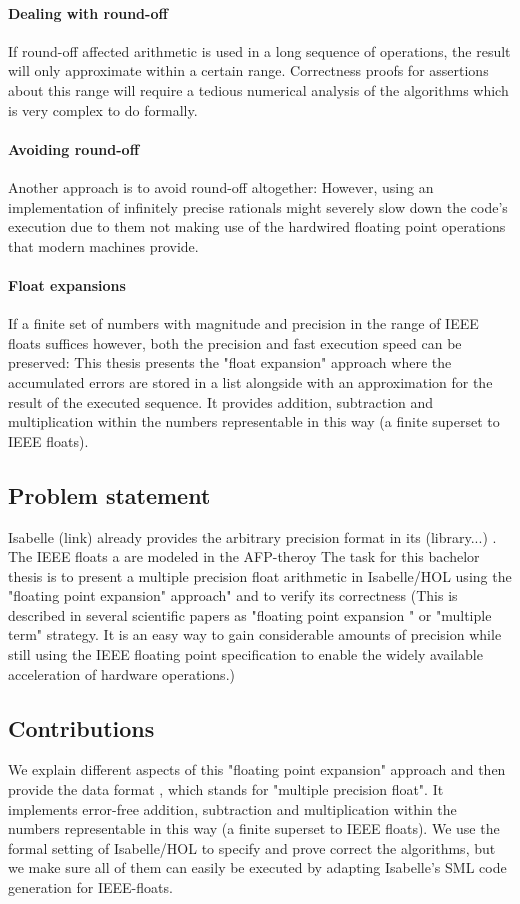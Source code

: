 \documentclass[11pt,a4paper]{article}
\begin{document}
\paragraph{Dealing with round-off}
If round-off affected arithmetic is used in a long sequence of operations, the result will only approximate within a certain range. Correctness proofs for assertions about this range will require a tedious numerical analysis of the algorithms which is very complex to do formally.

\paragraph{Avoiding round-off}
Another approach is to avoid round-off altogether: However, using an implementation of infinitely precise rationals might severely slow down the code's execution due to them not making use of the hardwired floating point operations that modern machines provide.

\paragraph{Float expansions} If a finite set of numbers with magnitude and precision in the range of IEEE floats suffices however, both the precision and fast execution speed can be preserved: This thesis presents the "float expansion" approach where the accumulated errors are stored in a list alongside with an approximation for the result of the executed sequence. It provides addition, subtraction and multiplication within the numbers representable in this way (a finite superset to IEEE floats).

\subsection{Problem statement}
Isabelle (link) already provides the arbitrary precision format
in its (library...) . The IEEE floats a are modeled in the AFP-theroy
The task for this bachelor thesis is to present a multiple precision float arithmetic in Isabelle/HOL using the "floating point expansion" approach" and to verify its correctness
(This is described in several scientific papers as "floating point expansion " or "multiple term" strategy. It is an easy way to gain considerable amounts of precision while still using the IEEE floating point specification to enable the widely available acceleration of hardware operations.)

\subsection{Contributions}
We explain different aspects of this "floating point expansion" approach and then provide the data format \typmpf
, which stands for "multiple precision float". It implements error-free addition, subtraction and multiplication within the numbers representable in this way (a finite superset to IEEE floats).
We use the formal setting of Isabelle/HOL to specify and prove correct the algorithms, but we make sure all of them can easily be executed by adapting Isabelle's SML code generation for IEEE-floats.
\end{document}

